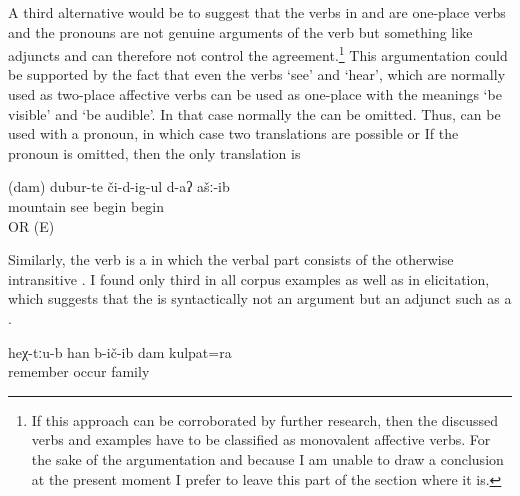 A third alternative would be to suggest that the verbs in  and  are one-place verbs and the  pronouns are not genuine arguments of the verb but something like adjuncts and can therefore not control the agreement.\footnote{If this approach can be corroborated by further research, then the discussed verbs and examples have to be classified as monovalent affective verbs. For the sake of the argumentation and because I am unable to draw a conclusion at the present moment I prefer to leave this part of the section where it is.} This argumentation could be supported by the fact that even the verbs `see' and `hear', which are normally used as two-place affective verbs can be used as one-place  with the meanings `be visible' and `be audible'. In that case normally the   can be omitted. Thus,  can be used with a  pronoun, in which case two translations are possible  or  If the pronoun is omitted, then the only translation is 

\begin{exe}
	\ex	\label{ex:‎I began to see the mountains2}
	\gll	(dam)	dubur-te	či-d-ig-ul	d-aʔ	ašː-ib\\
			mountain	see	begin	begin\\
	\glt	{} OR  (E)
\end{exe}


Similarly, the verb  is a  in which the verbal part consists of the otherwise intransitive   . I found only third  in all corpus examples as well as in elicitation, which suggests that the   is syntactically not an argument but an adjunct such as a  . 

\begin{exe}
	\ex	\label{ex:There I also remembered my family remember}
	\gll	heχ-tːu-b	han	b-ič-ib	dam	kulpat=ra\\
			remember	occur		family\\
	\glt	{}
\end{exe}


